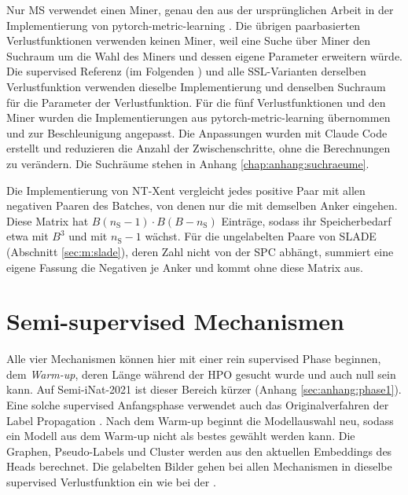 Nur \ac{MS} verwendet einen Miner, genau den aus der ursprünglichen Arbeit \cite{wang_multi-similarity_2019} in der Implementierung von pytorch-metric-learning \cite{musgrave_pytorch_2020}. Die übrigen paarbasierten Verlustfunktionen verwenden keinen Miner, weil eine Suche über Miner den Suchraum um die Wahl des Miners und dessen eigene Parameter erweitern würde. Die supervised Referenz (im Folgenden \UEBL) und alle \ac{SSL}-Varianten derselben Verlustfunktion verwenden dieselbe Implementierung und denselben Suchraum für die Parameter der Verlustfunktion. Für die fünf Verlustfunktionen und den Miner wurden die Implementierungen aus pytorch-metric-learning übernommen und zur Beschleunigung angepasst. Die Anpassungen wurden mit Claude Code erstellt und reduzieren die Anzahl der Zwischenschritte, ohne die Berechnungen zu verändern. Die Suchräume stehen in Anhang \ref{chap:anhang:suchraeume}.

Die Implementierung von \ac{NT-Xent} vergleicht jedes positive Paar mit allen negativen Paaren des Batches, von denen nur die mit demselben Anker eingehen. Diese Matrix hat $B(n_{\mathrm{S}}-1)\cdot B(B-n_{\mathrm{S}})$ Einträge, sodass ihr Speicherbedarf etwa mit $B^3$ und mit $n_{\mathrm{S}}-1$ wächst. Für die ungelabelten Paare von \ac{SLADE} (Abschnitt \ref{sec:m:slade}), deren Zahl nicht von der \ac{SPC} abhängt, summiert eine eigene Fassung die Negativen je Anker und kommt ohne diese Matrix aus.

\section{Semi-supervised Mechanismen}
\label{sec:m:ssl}

Alle vier Mechanismen können hier mit einer rein supervised Phase beginnen, dem \emph{Warm-up}, deren Länge während der \ac{HPO} gesucht wurde und auch null sein kann. Auf Semi-iNat-2021 ist dieser Bereich kürzer (Anhang \ref{sec:anhang:phase1}). Eine solche supervised Anfangsphase verwendet auch das Originalverfahren der Label Propagation \cite{iscen_label_2019}. Nach dem Warm-up beginnt die Modellauswahl neu, sodass ein Modell aus dem Warm-up nicht als bestes gewählt werden kann. Die Graphen, Pseudo-Labels und Cluster werden aus den aktuellen Embeddings des Heads berechnet. Die gelabelten Bilder gehen bei allen Mechanismen in dieselbe supervised Verlustfunktion ein wie bei der \UEBL.

